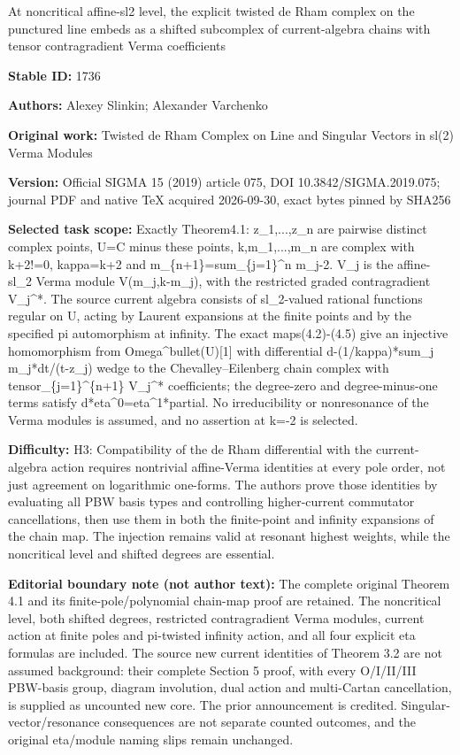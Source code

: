 \documentclass[11pt]{article}
\numberwithin{equation}{section}
\begin{document}
\begin{center}\Large At noncritical affine-sl2 level, the explicit twisted de Rham complex on the punctured line embeds as a shifted subcomplex of current-algebra chains with tensor contragradient Verma coefficients\end{center}
\noindent\textbf{Stable ID:} 1736\par
\noindent\textbf{Authors:} Alexey Slinkin; Alexander Varchenko\par
\noindent\textbf{Original work:} Twisted de Rham Complex on Line and Singular Vectors in sl(2) Verma Modules\par
\noindent\textbf{Version:} Official SIGMA 15 (2019) article 075, DOI 10.3842/SIGMA.2019.075; journal PDF and native TeX acquired 2026-09-30, exact bytes pinned by SHA256\par
\noindent\textbf{Selected task scope:} Exactly Theorem4.1: z\_1,...,z\_n are pairwise distinct complex points, U=C minus these points, k,m\_1,...,m\_n are complex with k+2!=0, kappa=k+2 and m\_\{n+1\}=sum\_\{j=1\}\textasciicircum{}n m\_j-2. V\_j is the affine-sl\_2 Verma module V(m\_j,k-m\_j), with the restricted graded contragradient V\_j\textasciicircum{}*. The source current algebra consists of sl\_2-valued rational functions regular on U, acting by Laurent expansions at the finite points and by the specified pi automorphism at infinity. The exact maps(4.2)-(4.5) give an injective homomorphism from Omega\textasciicircum{}bullet(U)[1] with differential d-(1/kappa)*sum\_j m\_j*dt/(t-z\_j) wedge to the Chevalley–Eilenberg chain complex with tensor\_\{j=1\}\textasciicircum{}\{n+1\} V\_j\textasciicircum{}* coefficients; the degree-zero and degree-minus-one terms satisfy d*eta\textasciicircum{}0=eta\textasciicircum{}1*partial. No irreducibility or nonresonance of the Verma modules is assumed, and no assertion at k=-2 is selected.\par
\noindent\textbf{Difficulty:} H3: Compatibility of the de Rham differential with the current-algebra action requires nontrivial affine-Verma identities at every pole order, not just agreement on logarithmic one-forms. The authors prove those identities by evaluating all PBW basis types and controlling higher-current commutator cancellations, then use them in both the finite-point and infinity expansions of the chain map. The injection remains valid at resonant highest weights, while the noncritical level and shifted degrees are essential.\par
\noindent\textbf{Editorial boundary note (not author text):} The complete original Theorem 4.1 and its finite-pole/polynomial chain-map proof are retained. The noncritical level, both shifted degrees, restricted contragradient Verma modules, current action at finite poles and pi-twisted infinity action, and all four explicit eta formulas are included. The source new current identities of Theorem 3.2 are not assumed background: their complete Section 5 proof, with every O/I/II/III PBW-basis group, diagram involution, dual action and multi-Cartan cancellation, is supplied as uncounted new core. The prior announcement is credited. Singular-vector/resonance consequences are not separate counted outcomes, and the original eta/module naming slips remain unchanged.\par
\end{document}
